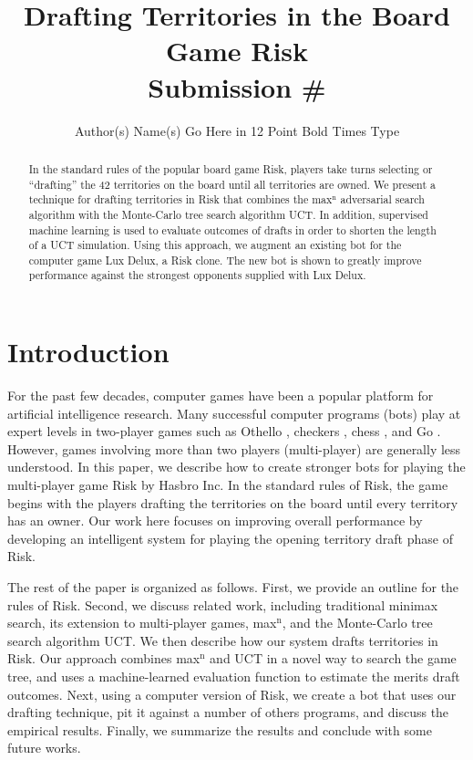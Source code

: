 \documentclass[letterpaper]{article}
\title{Drafting Territories in the Board Game Risk\\ Submission \#}
\author{Author(s) Name(s) Go Here in 12 Point Bold Times Type}
\numberwithin{equation}{section}
\numberwithin{theorem}{section}
\numberwithin{lemma}{section}
\numberwithin{df}{section}
\begin{document}
\maketitle

\begin{abstract}
In the standard rules of the popular board game Risk, players take turns selecting or ``drafting'' the 42 territories on the board until all territories are owned.  We present a technique for drafting territories in Risk that combines the max$^\text{n}$ adversarial search algorithm with the Monte-Carlo tree search algorithm UCT.  In addition, supervised machine learning is used to evaluate outcomes of drafts in order to shorten the length of a UCT simulation.  Using this approach, we augment an existing bot for the computer game Lux Delux, a Risk clone.  The new bot is shown to greatly improve performance against the strongest opponents supplied with Lux Delux.
\end{abstract}

\section{Introduction}


For the past few decades, computer games have been a popular platform for artificial intelligence research.  Many successful computer programs (bots) play at expert levels in two-player games such as Othello \cite{Othello}, 
checkers \cite{Chinook}, chess \cite{DeepBlue}, 
and Go \cite{ComputerGo}.  However, games involving more than two players (multi-player) are generally less understood.  In this paper, we describe how to create stronger bots for playing the multi-player game Risk by Hasbro Inc.  In the standard rules of Risk, the game begins with the players drafting the territories on the board until every territory has an owner.  Our work here focuses  on improving overall performance by developing an intelligent system for playing the opening territory draft phase of Risk.

The rest of the paper is organized as follows.  First, we provide an outline for the rules of Risk.  Second, we discuss related work, including traditional minimax search, its extension to multi-player games, max$^\text{n}$, and the Monte-Carlo tree search algorithm UCT.  We then describe how our system drafts territories in Risk.  Our approach combines max$^\text{n}$ and UCT in a novel way to search the game tree, and uses a machine-learned evaluation function to estimate the merits draft outcomes.  Next, using a computer version of Risk, we create a bot that uses our drafting technique, pit it against a number of others programs, and discuss the empirical results.  Finally, we summarize the results and conclude with some future works.
\end{document}
